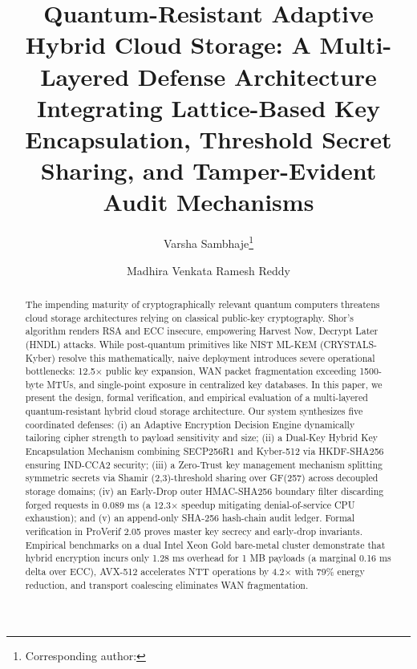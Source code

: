 \documentclass{llncs}
\begin{document}

\title{Quantum-Resistant Adaptive Hybrid Cloud Storage: A Multi-Layered Defense Architecture Integrating Lattice-Based Key Encapsulation, Threshold Secret Sharing, and Tamper-Evident Audit Mechanisms}

\author{Varsha Sambhaje\thanks{Corresponding author: } \and
Madhira Venkata Ramesh Reddy}



\maketitle

\begin{abstract}
The impending maturity of cryptographically relevant quantum computers threatens cloud storage architectures relying on classical public-key cryptography. Shor's algorithm renders RSA and ECC insecure, empowering Harvest Now, Decrypt Later (HNDL) attacks. While post-quantum primitives like NIST ML-KEM (CRYSTALS-Kyber) resolve this mathematically, naive deployment introduces severe operational bottlenecks: 12.5$\times$ public key expansion, WAN packet fragmentation exceeding 1500-byte MTUs, and single-point exposure in centralized key databases. In this paper, we present the design, formal verification, and empirical evaluation of a multi-layered quantum-resistant hybrid cloud storage architecture. Our system synthesizes five coordinated defenses: (i) an Adaptive Encryption Decision Engine dynamically tailoring cipher strength to payload sensitivity and size; (ii) a Dual-Key Hybrid Key Encapsulation Mechanism combining SECP256R1 and Kyber-512 via HKDF-SHA256 ensuring IND-CCA2 security; (iii) a Zero-Trust key management mechanism splitting symmetric secrets via Shamir (2,3)-threshold sharing over GF(257) across decoupled storage domains; (iv) an Early-Drop outer HMAC-SHA256 boundary filter discarding forged requests in 0.089 ms (a 12.3$\times$ speedup mitigating denial-of-service CPU exhaustion); and (v) an append-only SHA-256 hash-chain audit ledger. Formal verification in ProVerif 2.05 proves master key secrecy and early-drop invariants. Empirical benchmarks on a dual Intel Xeon Gold bare-metal cluster demonstrate that hybrid encryption incurs only 1.28 ms overhead for 1 MB payloads (a marginal 0.16 ms delta over ECC), AVX-512 accelerates NTT operations by 4.2$\times$ with 79\% energy reduction, and transport coalescing eliminates WAN fragmentation.

\end{abstract}
\end{document}
